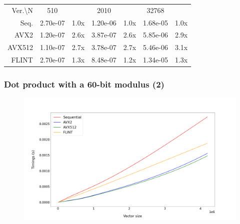 \documentclass[10pt]{beamer}
\begin{document}
\begin{frame}
\begin{table}[h!]
        \begin{tabular}{|r|*{3}{c c|}}
            \hline
            \rowcolor{myGray}
            \multicolumn{7}{|c|}{\textsc{Zen 4}} \\
    
            \hline
            \rowcolor{myGray}
            Ver.\textbackslash N & 510 & & 2010 & & 32768 & \\
            \hline
            \cellcolor{myGray} Seq. & 2.70e-07 & 1.0x & 1.20e-06 & 1.0x & 1.68e-05 & 1.0x \\
            \hline
            \cellcolor{myGray} AVX2 & 1.20e-07 & 2.6x & 3.87e-07 & 2.6x & 5.85e-06 & 2.9x \\
            \hline
            \cellcolor{myGray} AVX512 & 1.10e-07 & 2.7x & 3.78e-07 & 2.7x & 5.46e-06 & 3.1x \\
            \hline
            \cellcolor{myGray} FLINT & 2.70e-07 & 1.3x & 8.48e-07 & 1.2x & 1.34e-05 & 1.3x \\
            \hline
        \end{tabular}
    \end{table}
\end{frame}
    
\begin{frame}
    \frametitle{Dot product with a 60-bit modulus (2)}

    \begin{figure}[h!]
        \begin{center}
            \includegraphics[width=1\textwidth]{dot-prod-mod_argiope.png}
        \end{center}
    \end{figure}
\end{frame}
\end{document}
